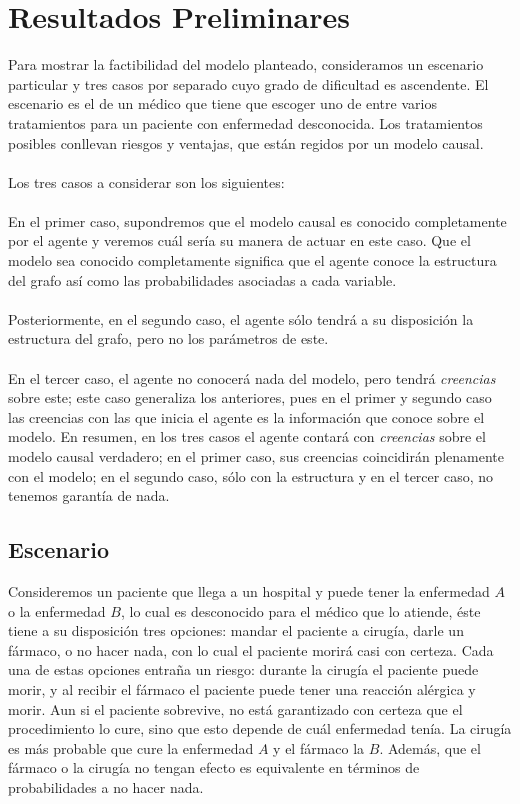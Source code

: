 \documentclass[11pt]{article}
\theoremstyle{plain}
\begin{document}
\section{Resultados Preliminares}
Para mostrar la factibilidad del modelo planteado, consideramos un escenario particular y tres casos por separado cuyo grado de dificultad es ascendente. El escenario es el de un médico que tiene que escoger uno de entre varios tratamientos para un paciente con enfermedad desconocida. Los tratamientos posibles conllevan riesgos y ventajas, que están regidos por un modelo causal.\\
\\
Los tres casos a considerar son los siguientes:\\
\\
En el primer caso, supondremos que el modelo causal es conocido completamente por el agente y veremos cuál sería su manera de actuar en este caso. Que el modelo sea conocido completamente significa que el agente conoce la estructura del grafo así como las probabilidades asociadas a cada variable.\\
\\ 
Posteriormente, en el segundo caso, el agente sólo tendrá a su disposición la estructura del grafo, pero no los parámetros de este. \\
\\
En el tercer caso, el agente no conocerá nada del modelo, pero tendrá \textit{creencias} sobre este; este caso generaliza los anteriores, pues en el primer y segundo caso las creencias con las que inicia el agente es la información que conoce sobre el modelo. En resumen, en los tres casos el agente contará con \textit{creencias} sobre el modelo causal verdadero; en el primer caso, sus creencias coincidirán plenamente con el modelo; en el segundo caso, sólo con la estructura y en el tercer caso, no tenemos garantía de nada. 
\subsection{Escenario}
Consideremos un paciente que llega a un hospital y puede tener la enfermedad $A$ o la enfermedad $B$, lo cual es desconocido para el médico que lo atiende, éste tiene a su disposición tres opciones: mandar el paciente a cirugía, darle un fármaco, o no hacer nada, con lo cual el paciente morirá casi con certeza. Cada una de estas opciones entraña un riesgo: durante la cirugía el paciente puede morir, y al recibir el fármaco el paciente puede tener una reacción alérgica y morir. Aun si el paciente sobrevive, no está garantizado con certeza que el procedimiento lo cure, sino que esto depende de cuál enfermedad tenía. La cirugía es más probable que cure la enfermedad $A$ y el fármaco la $B$. Además, que el fármaco o la cirugía no tengan efecto es equivalente en términos de probabilidades a no hacer nada. 
\end{document}

